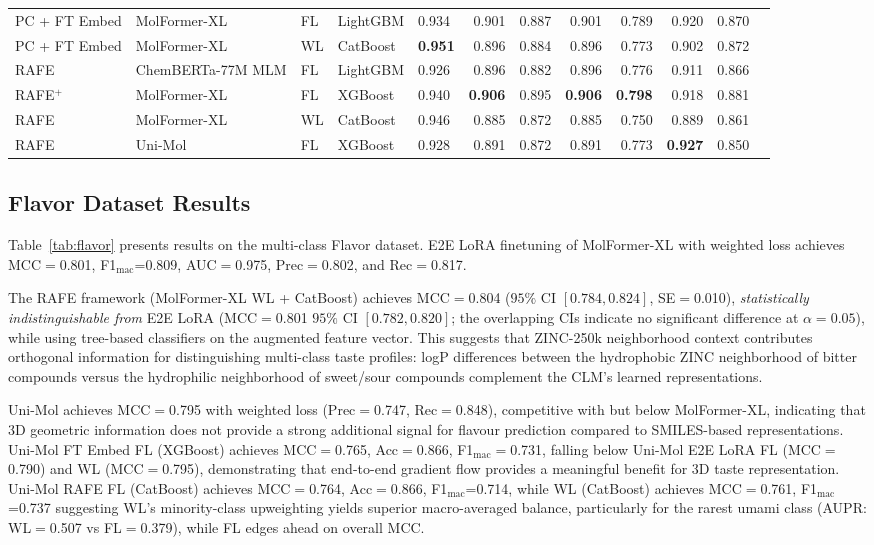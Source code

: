 \documentclass[9pt,twocolumn,conference]{IEEEtran}
\begin{document}
\begin{table}[!ht]
{\begin{tabular}{lllllrrrrrrr}
PC + FT Embed & MolFormer-XL & FL & LightGBM & 0.934 & 0.901 & 0.887 & 0.901 & 0.789 & 0.920 & 0.870 \\
PC + FT Embed & MolFormer-XL & WL & CatBoost & \textbf{0.951} & 0.896 & 0.884 & 0.896 & 0.773 & 0.902 & 0.872 \\
\midrule
RAFE & ChemBERTa-77M MLM & FL & LightGBM & 0.926 & 0.896 & 0.882 & 0.896 & 0.776 & 0.911 & 0.866 \\
RAFE$^+$ & MolFormer-XL & FL & XGBoost & 0.940 & \textbf{0.906} & 0.895 & \textbf{0.906} & \textbf{0.798} & 0.918 & 0.881 \\
RAFE & MolFormer-XL & WL & CatBoost & 0.946 & 0.885 & 0.872 & 0.885 & 0.750 & 0.889 & 0.861 \\
RAFE & Uni-Mol & FL & XGBoost & 0.928 & 0.891 & 0.872 & 0.891 & 0.773 & \textbf{0.927} & 0.850 \\
\bottomrule
\end{tabular}
}
\end{table}
\subsection{Flavor Dataset Results}
Table~\ref{tab:flavor} presents results on the multi-class Flavor dataset. E2E LoRA finetuning of MolFormer-XL with weighted loss achieves MCC$=$0.801, F1$_\text{mac}$=$0.809$, AUC$=$0.975, Prec$=$0.802, and Rec$=$0.817.

The RAFE framework (MolFormer-XL WL + CatBoost) achieves MCC$=$0.804 ($95\%$ CI $[0.784, 0.824]$, SE$=$0.010), \emph{statistically indistinguishable from} E2E LoRA (MCC$=$0.801 $95\%$ CI $[0.782, 0.820]$; the overlapping CIs indicate no significant difference at $\alpha = 0.05$), while using tree-based classifiers on the augmented feature vector. This suggests that ZINC-250k neighborhood context contributes orthogonal information for distinguishing multi-class taste profiles: logP differences between the
hydrophobic ZINC neighborhood of bitter compounds versus the hydrophilic neighborhood of sweet/sour compounds complement the CLM's learned representations.

Uni-Mol achieves MCC$=$0.795 with weighted loss (Prec$=$0.747, Rec$=$0.848), competitive with but below MolFormer-XL, indicating that 3D geometric information does not provide a strong additional signal for flavour prediction compared to SMILES-based representations. Uni-Mol FT Embed FL (XGBoost) achieves MCC$=$0.765, Acc$=$0.866, F1$_\text{mac}=$0.731, falling below Uni-Mol E2E LoRA FL (MCC$=$0.790) and WL (MCC$=$0.795), demonstrating that end-to-end gradient flow provides a meaningful benefit for 3D taste representation. Uni-Mol RAFE FL (CatBoost) achieves MCC$=$0.764, Acc$=$0.866, F1$_\text{mac}$=0.714, while WL (CatBoost) achieves MCC$=$0.761, F1$_\text{mac}$=0.737 suggesting WL's minority-class upweighting yields superior macro-averaged balance, particularly for the rarest umami class (AUPR: WL$=$0.507 vs FL$=$0.379), while FL edges ahead on overall MCC.
\end{document}
